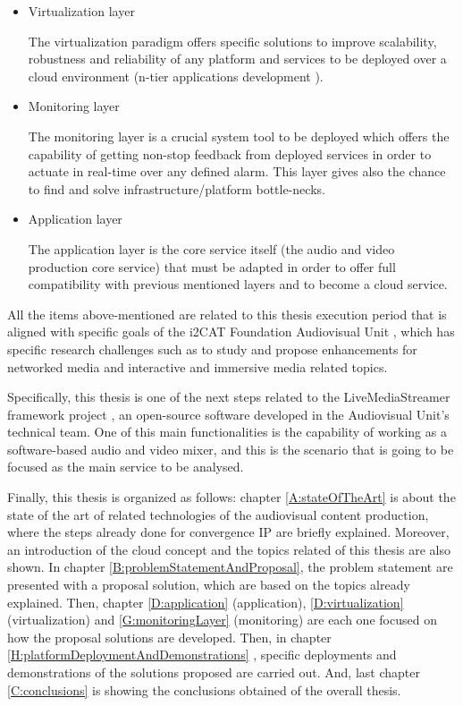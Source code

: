 \begin{itemize}
\item Virtualization layer \hfill 

The virtualization paradigm offers specific solutions to improve scalability, robustness and reliability of any platform and services to be deployed over a cloud environment (n-tier applications development \cite{n-tier architecture}). 

\item Monitoring layer \hfill 

The monitoring layer is a crucial system tool to be deployed which offers the capability of getting non-stop feedback from deployed services in order to actuate in real-time over any defined alarm. This layer gives also the chance to find and solve infrastructure/platform bottle-necks.

\item Application layer \hfill 

The application layer is the core service itself (the audio and video production core service) that must be adapted in order to offer full compatibility with previous mentioned layers and to become a cloud service.

\end{itemize}

All the items above-mentioned are related to this thesis execution period that is aligned with specific goals of the i2CAT Foundation Audiovisual Unit \cite{i2catua}, which has specific research challenges such as to study and propose enhancements for networked media and interactive and immersive media related topics. 

Specifically, this thesis is one of the next steps related to the LiveMediaStreamer framework project \cite{lmsGITHUB}, an open-source software developed in the Audiovisual Unit's technical team. One of this main functionalities is the capability of working as a software-based audio and video mixer, and this is the scenario that is going to be focused as the main service to be analysed.

Finally, this thesis is organized as follows: chapter \ref{A:stateOfTheArt} is about the state of the art of related technologies of the audiovisual content production, where the steps already done for convergence IP are briefly explained. Moreover, an introduction of the cloud concept and the topics related of this thesis are also shown. In chapter \ref{B:problemStatementAndProposal}, the problem statement are presented with a proposal solution, which are based on the topics already explained. Then, chapter \ref{D:application} (application), \ref{D:virtualization} (virtualization) and \ref{G:monitoringLayer} (monitoring) are each one focused on how the proposal solutions are developed. Then, in chapter \ref{H:platformDeploymentAndDemonstrations}
, specific deployments and demonstrations of the solutions proposed are carried out. And, last chapter \ref{C:conclusions} is showing the conclusions obtained of the overall thesis.





